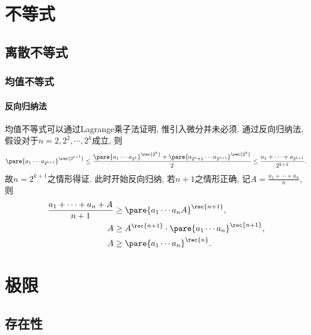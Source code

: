 \documentclass{ctexart}
\begin{document}

\section{不等式} %
\label{sec:不等式}

\subsection{离散不等式} %
\label{sub:离散不等式}

\subsubsection{均值不等式} %
\label{ssub:均值不等式}

\paragraph{反向归纳法} %
\label{par:反向归纳法}

均值不等式可以通过Lagrange乘子法证明, 惟引入微分并未必须. 通过反向归纳法, 假设对于$n=2,2^2,\cdots,2^k$成立, 则
\[ \pare{a_1\cdots a_{2^{k+1}}}^{\rec{2^{k+1}}} \le \frac{\pare{a_1\cdots a_{2^{k}}}^{\rec{2^{k}}} + \pare{a_{2^k+1}\cdots a_{2^{k+1}}}^{\rec{2^{k}}}}{2} \le \frac{a_1+\cdots + a_{2^{k+1}}}{2^{k+1}}.  \]
故$n=2^{k+1}$之情形得证. 此时开始反向归纳, 若$n+1$之情形正确, 记$\displaystyle A = \frac{a_1+\cdots+a_n}{n}$, 则
\begin{align*}
    \frac{a_1+\cdots+a_n + A}{n+1} &\ge \pare{a_1\cdots a_nA}^{\rec{n+1}}, \\
    A &\ge A^{\rec{n+1}} \cdot \pare{a_1\cdots a_n}^{\rec{n+1}}, \\
    A &\ge \pare{a_1\cdots a_n}^{\rec{n}}.
\end{align*}





\section{极限} %
\label{sec:极限}

\subsection{存在性} %
\label{sub:存在性}
\end{document}
